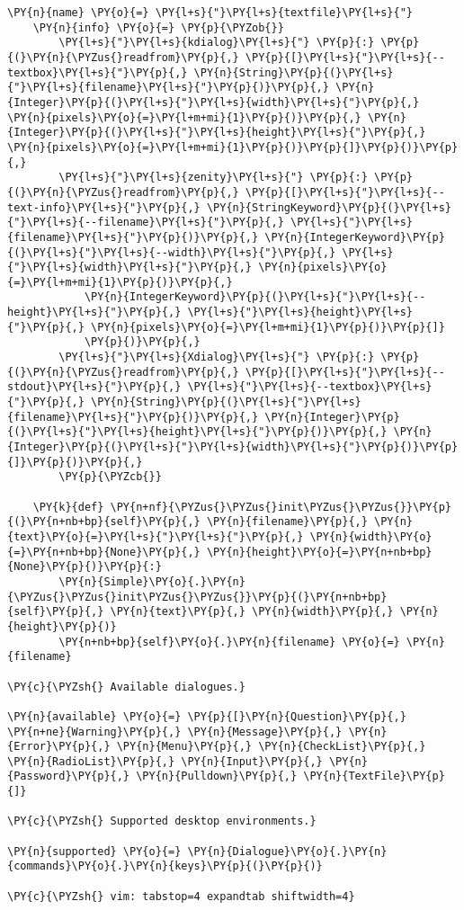 \begin{Verbatim}[commandchars=\\\{\}]
    \PY{n}{name} \PY{o}{=} \PY{l+s}{"}\PY{l+s}{textfile}\PY{l+s}{"}
    \PY{n}{info} \PY{o}{=} \PY{p}{\PYZob{}}
        \PY{l+s}{"}\PY{l+s}{kdialog}\PY{l+s}{"} \PY{p}{:} \PY{p}{(}\PY{n}{\PYZus{}readfrom}\PY{p}{,} \PY{p}{[}\PY{l+s}{"}\PY{l+s}{--textbox}\PY{l+s}{"}\PY{p}{,} \PY{n}{String}\PY{p}{(}\PY{l+s}{"}\PY{l+s}{filename}\PY{l+s}{"}\PY{p}{)}\PY{p}{,} \PY{n}{Integer}\PY{p}{(}\PY{l+s}{"}\PY{l+s}{width}\PY{l+s}{"}\PY{p}{,} \PY{n}{pixels}\PY{o}{=}\PY{l+m+mi}{1}\PY{p}{)}\PY{p}{,} \PY{n}{Integer}\PY{p}{(}\PY{l+s}{"}\PY{l+s}{height}\PY{l+s}{"}\PY{p}{,} \PY{n}{pixels}\PY{o}{=}\PY{l+m+mi}{1}\PY{p}{)}\PY{p}{]}\PY{p}{)}\PY{p}{,}
        \PY{l+s}{"}\PY{l+s}{zenity}\PY{l+s}{"} \PY{p}{:} \PY{p}{(}\PY{n}{\PYZus{}readfrom}\PY{p}{,} \PY{p}{[}\PY{l+s}{"}\PY{l+s}{--text-info}\PY{l+s}{"}\PY{p}{,} \PY{n}{StringKeyword}\PY{p}{(}\PY{l+s}{"}\PY{l+s}{--filename}\PY{l+s}{"}\PY{p}{,} \PY{l+s}{"}\PY{l+s}{filename}\PY{l+s}{"}\PY{p}{)}\PY{p}{,} \PY{n}{IntegerKeyword}\PY{p}{(}\PY{l+s}{"}\PY{l+s}{--width}\PY{l+s}{"}\PY{p}{,} \PY{l+s}{"}\PY{l+s}{width}\PY{l+s}{"}\PY{p}{,} \PY{n}{pixels}\PY{o}{=}\PY{l+m+mi}{1}\PY{p}{)}\PY{p}{,}
            \PY{n}{IntegerKeyword}\PY{p}{(}\PY{l+s}{"}\PY{l+s}{--height}\PY{l+s}{"}\PY{p}{,} \PY{l+s}{"}\PY{l+s}{height}\PY{l+s}{"}\PY{p}{,} \PY{n}{pixels}\PY{o}{=}\PY{l+m+mi}{1}\PY{p}{)}\PY{p}{]}
            \PY{p}{)}\PY{p}{,}
        \PY{l+s}{"}\PY{l+s}{Xdialog}\PY{l+s}{"} \PY{p}{:} \PY{p}{(}\PY{n}{\PYZus{}readfrom}\PY{p}{,} \PY{p}{[}\PY{l+s}{"}\PY{l+s}{--stdout}\PY{l+s}{"}\PY{p}{,} \PY{l+s}{"}\PY{l+s}{--textbox}\PY{l+s}{"}\PY{p}{,} \PY{n}{String}\PY{p}{(}\PY{l+s}{"}\PY{l+s}{filename}\PY{l+s}{"}\PY{p}{)}\PY{p}{,} \PY{n}{Integer}\PY{p}{(}\PY{l+s}{"}\PY{l+s}{height}\PY{l+s}{"}\PY{p}{)}\PY{p}{,} \PY{n}{Integer}\PY{p}{(}\PY{l+s}{"}\PY{l+s}{width}\PY{l+s}{"}\PY{p}{)}\PY{p}{]}\PY{p}{)}\PY{p}{,}
        \PY{p}{\PYZcb{}}

    \PY{k}{def} \PY{n+nf}{\PYZus{}\PYZus{}init\PYZus{}\PYZus{}}\PY{p}{(}\PY{n+nb+bp}{self}\PY{p}{,} \PY{n}{filename}\PY{p}{,} \PY{n}{text}\PY{o}{=}\PY{l+s}{"}\PY{l+s}{"}\PY{p}{,} \PY{n}{width}\PY{o}{=}\PY{n+nb+bp}{None}\PY{p}{,} \PY{n}{height}\PY{o}{=}\PY{n+nb+bp}{None}\PY{p}{)}\PY{p}{:}
        \PY{n}{Simple}\PY{o}{.}\PY{n}{\PYZus{}\PYZus{}init\PYZus{}\PYZus{}}\PY{p}{(}\PY{n+nb+bp}{self}\PY{p}{,} \PY{n}{text}\PY{p}{,} \PY{n}{width}\PY{p}{,} \PY{n}{height}\PY{p}{)}
        \PY{n+nb+bp}{self}\PY{o}{.}\PY{n}{filename} \PY{o}{=} \PY{n}{filename}

\PY{c}{\PYZsh{} Available dialogues.}

\PY{n}{available} \PY{o}{=} \PY{p}{[}\PY{n}{Question}\PY{p}{,} \PY{n+ne}{Warning}\PY{p}{,} \PY{n}{Message}\PY{p}{,} \PY{n}{Error}\PY{p}{,} \PY{n}{Menu}\PY{p}{,} \PY{n}{CheckList}\PY{p}{,} \PY{n}{RadioList}\PY{p}{,} \PY{n}{Input}\PY{p}{,} \PY{n}{Password}\PY{p}{,} \PY{n}{Pulldown}\PY{p}{,} \PY{n}{TextFile}\PY{p}{]}

\PY{c}{\PYZsh{} Supported desktop environments.}

\PY{n}{supported} \PY{o}{=} \PY{n}{Dialogue}\PY{o}{.}\PY{n}{commands}\PY{o}{.}\PY{n}{keys}\PY{p}{(}\PY{p}{)}

\PY{c}{\PYZsh{} vim: tabstop=4 expandtab shiftwidth=4}
\end{Verbatim}
